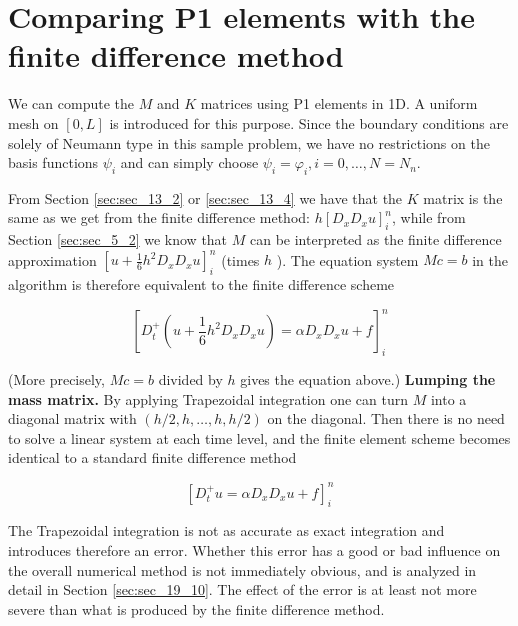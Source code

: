 \documentclass[../main.tex]{subfiles}
\begin{document}
	\section[Comparing P1 elements with the finite difference method]{Comparing P1 elements with the finite difference method}
		\label{sec:sec_19_6}
		
		\noindent We can compute the $M$ and $K$ matrices using P1 elements in 1D. A uniform mesh on $[0, L]$ is introduced for this purpose. Since the boundary conditions are solely of Neumann type in this sample problem, we have no restrictions on the basis functions $\psi_{i}$ and can simply choose $\psi_{i}=\varphi_{i}, i=0, \ldots, N=N_{n}$.
		
		From Section \ref{sec:sec_13_2} or \ref{sec:sec_13_4} we have that the $K$ matrix is the same as we get from the finite difference method: $h\left[D_{x} D_{x} u\right]_{i}^{n}$, while from Section \ref{sec:sec_5_2} we know that $M$ can be interpreted as the finite difference approximation $\left[u+\frac{1}{6} h^{2} D_{x} D_{x} u\right]_{i}^{n}$ (times $h$ ). The equation system $M c=b$ in the algorithm is therefore equivalent to the finite difference scheme
		
		\begin{equation}
		\label{eqa227}	
			\left[D_{t}^{+}\left(u+\frac{1}{6} h^{2} D_{x} D_{x} u\right)=\alpha D_{x} D_{x} u+f\right]_{i}^{n}
		\end{equation}
	
		(More precisely, $M c=b$ divided by $h$ gives the equation above.)\bigbreak
		\noindent \textbf{Lumping the mass matrix.   } By applying Trapezoidal integration one can turn $M$ into a diagonal matrix with $(h / 2, h, \ldots, h, h / 2)$ on the diagonal. Then there is no need to solve a linear system at each time level, and the finite element scheme becomes identical to a standard finite difference method
		
		\begin{equation}
		\label{eqa228}	
			\left[D_{t}^{+} u=\alpha D_{x} D_{x} u+f\right]_{i}^{n}
		\end{equation}
		
		The Trapezoidal integration is not as accurate as exact integration and introduces therefore an error. Whether this error has a good or bad influence on the overall numerical method is not immediately obvious, and is analyzed in detail in Section \ref{sec:sec_19_10}. The effect of the error is at least not more severe than what is produced by the finite difference method.
		
\end{document}
